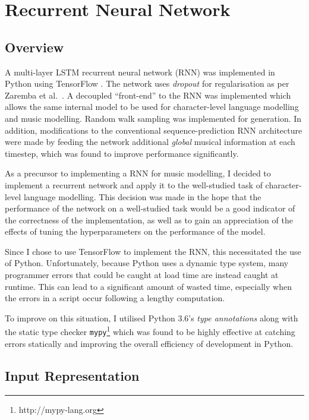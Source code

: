 \documentclass[12pt,a4paper,twoside,openright]{report}
\begin{document}
\section{Recurrent Neural Network}

\subsection{Overview}

A multi-layer LSTM recurrent neural network (RNN) was implemented in Python
using TensorFlow \cite{abadi2016tensorflow}. The network uses \emph{dropout} for
regularisation as per Zaremba et al.\ \cite{zaremba2014recurrent}. A decoupled
``front-end'' to the RNN was implemented which allows the same internal model to
be used for character-level language modelling and music modelling. Random walk
sampling was implemented for generation. In addition, modifications to the
conventional sequence-prediction RNN architecture were made by feeding the
network additional \emph{global} musical information at each timestep, which was
found to improve performance significantly.

As a precursor to implementing a RNN for music modelling, I decided to implement
a recurrent network and apply it to the well-studied task of character-level
language modelling. This decision was made in the hope that the performance of
the network on a well-studied task would be a good indicator of the correctness
of the implementation, as well as to gain an appreciation of the effects of
tuning the hyperparameters on the performance of the model.

Since I chose to use TensorFlow to implement the RNN, this necessitated the use
of Python. Unfortunately, because Python uses a dynamic type system, many
programmer errors that could be caught at load time are instead caught at
runtime. This can lead to a significant amount of wasted time, especially when
the errors in a script occur following a lengthy computation. 

To improve on this situation, I utilised Python 3.6's \emph{type annotations}
along with the static type checker \texttt{mypy}\footnote{http://mypy-lang.org}
which was found to be highly effective at catching errors statically and improving
the overall efficiency of development in Python.

\subsection{Input Representation}
\end{document}
